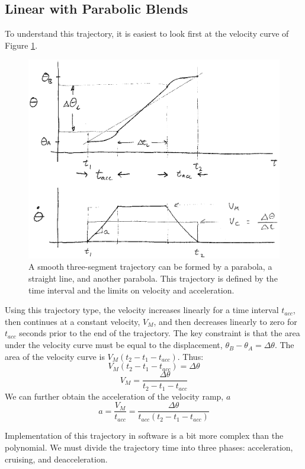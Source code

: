 \subsection{Linear with Parabolic Blends}
To understand this trajectory, it is easiest to look first at the velocity curve of Figure \ref{linearparabolic}.


\begin{figure}\centering
\includegraphics[width=13cm]{figs07/00512.eps}
\caption{A smooth three-segment trajectory can be formed by a parabola, a straight line, and another parabola.  This trajectory is defined by the time interval and the limits on velocity and acceleration. }\label{linearparabolic}
\end{figure}



Using this trajectory type, the velocity increases linearly for a time interval $t_{acc}$, then continues at a constant velocity, $V_M$, and then decreases linearly to zero for $t_{acc}$ seconds prior to the end of the trajectory.  The key constraint is that the area under the velocity curve must be equal to the displacement, $\theta_B-\theta_A = \Delta\theta$.  The area of the velocity curve is $V_M(t_2-t_1-t_{acc})$.  Thus:
\[
V_M(t_2-t_1-t_{acc}) = \Delta\theta
\]
\[
V_M = \frac{\Delta\theta}{t_2-t_1-t_{acc}}
\]
We can further obtain the acceleration of the velocity ramp, $a$
\[
a = \frac{V_M}{t_{acc}} = \frac{\Delta\theta}{t_{acc}(t_2-t_1-t_{acc})}
\]

Implementation of this trajectory in software is a bit more complex than the polynomial.  We must divide the trajectory time into three phases:  acceleration, cruising, and deacceleration.


